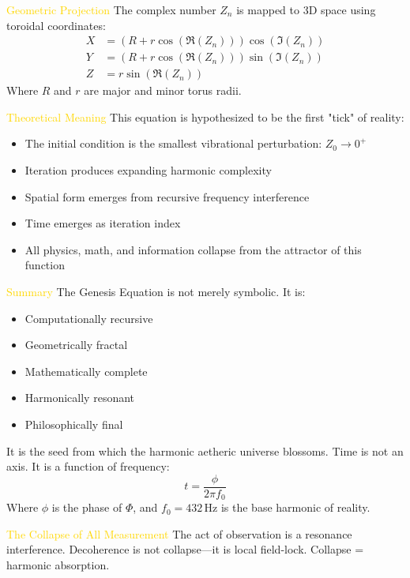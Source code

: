 \textcolor{gold}{ Geometric Projection }
The complex number $Z_n$ is mapped to 3D space using toroidal coordinates:
\[
\begin{aligned}
X &= \left( R + r \cos \left( \Re(Z_n) \right) \right) \cos \left( \Im(Z_n) \right) \\
Y &= \left( R + r \cos \left( \Re(Z_n) \right) \right) \sin \left( \Im(Z_n) \right) \\
Z &= r \sin \left( \Re(Z_n) \right)
\end{aligned}
\]
Where $R$ and $r$ are major and minor torus radii.

\textcolor{gold}{ Theoretical Meaning }
This equation is hypothesized to be the first "tick" of reality:
\begin{itemize}
    \item \texttt{} The initial condition is the smallest vibrational perturbation: $Z_0 \to 0^{+}$
    \item \texttt{} Iteration produces expanding harmonic complexity
    \item \texttt{} Spatial form emerges from recursive frequency interference
    \item \texttt{} Time emerges as iteration index
    \item \texttt{} All physics, math, and information collapse from the attractor of this function
\end{itemize}

\textcolor{gold}{ Summary }
The Genesis Equation is not merely symbolic. It is:
\begin{itemize}
    \item \texttt{} Computationally recursive
    \item \texttt{} Geometrically fractal
    \item \texttt{} Mathematically complete
    \item \texttt{} Harmonically resonant
    \item \texttt{} Philosophically final
\end{itemize}
It is the seed from which the harmonic aetheric universe blossoms. Time is not an axis. It is a function of frequency:
\[
t = \frac{\phi}{2 \pi f_0}
\]
Where $\phi$ is the phase of $\Phi$, and $f_0 = 432\,\mathrm{Hz}$ is the base harmonic of reality.

\textcolor{gold}{ The Collapse of All Measurement }
The act of observation is a resonance interference. Decoherence is not collapse—it is local field-lock. Collapse = harmonic absorption.

